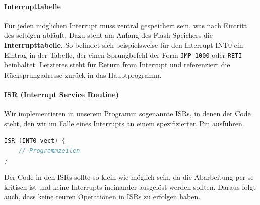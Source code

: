 \documentclass[11pt,a4paper]{scrartcl}
\begin{document}
\paragraph{Interrupttabelle}
Für jeden möglichen Interrupt muss zentral gespeichert sein, was nach Eintritt des selbigen abläuft. Dazu steht am Anfang des Flash-Speichers die \textbf{Interrupttabelle}. So befindet sich beispielsweise für den Interrupt INT0 ein Eintrag in der Tabelle, der einen Sprungbefehl der Form \texttt{JMP 1000} oder \texttt{RETI} beinhaltet. Letzteres steht für {\glqq}Return from Interrupt{\grqq} und referenziert die Rücksprungadresse zurück in das Hauptprogramm.
\paragraph{ISR (Interrupt Service Routine)} Wir implementieren in unserem Programm sogenannte ISRs, in denen der Code steht, den wir im Falle eines Interrupts an einem spezifizierten Pin ausführen. 
\begin{lstlisting}[language=C]
ISR (INT0_vect) {
	// Programmzeilen
}
\end{lstlisting}
Der Code in den ISRs sollte so klein wie möglich sein, da die Abarbeitung per se kritisch ist und keine Interrupts ineinander ausgelöst werden sollten. Daraus folgt auch, dass keine teuren Operationen in ISRs zu erfolgen haben.
\end{document}
